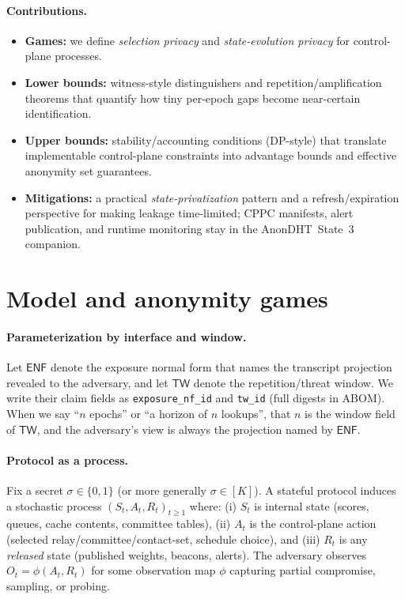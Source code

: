 \documentclass[11pt]{article}
\begin{document}
\paragraph{Contributions.}
\begin{itemize}[leftmargin=*]
\item \textbf{Games:} we define \emph{selection privacy} and \emph{state-evolution privacy} for control-plane processes.
\item \textbf{Lower bounds:} witness-style distinguishers and repetition/amplification theorems that quantify how tiny per-epoch gaps become near-certain identification.
\item \textbf{Upper bounds:} stability/accounting conditions (DP-style) that translate implementable control-plane constraints into advantage bounds and effective anonymity set guarantees.
\item \textbf{Mitigations:} a practical \emph{state-privatization} pattern and a refresh/expiration perspective for making leakage time-limited; CPPC manifests, alert publication, and runtime monitoring stay in the AnonDHT~State~3 companion.\cite{series:state3}
\end{itemize}


\section{Model and anonymity games}

\paragraph{Parameterization by interface and window.}
Let \(\mathsf{ENF}\) denote the exposure normal form that names the transcript projection revealed to the adversary, and let \(\mathsf{TW}\) denote the repetition/threat window.
We write their claim fields as \texttt{exposure\_nf\_id} and \texttt{tw\_id} (full digests in ABOM).
When we say ``\(n\) epochs'' or ``a horizon of \(n\) lookups'', that \(n\) is the window field of \(\mathsf{TW}\), and the adversary's view is always the projection named by \(\mathsf{ENF}\).

\label{sec:games}

\paragraph{Protocol as a process.}
Fix a secret $\sigma \in \{0,1\}$ (or more generally $\sigma\in[K]$).
A stateful protocol induces a stochastic process $(S_t,A_t,R_t)_{t\ge 1}$ where:
(i) $S_t$ is internal state (scores, queues, cache contents, committee tables),
(ii) $A_t$ is the control-plane action (selected relay/committee/contact-set, schedule choice), and
(iii) $R_t$ is any \emph{released} state (published weights, beacons, alerts).
The adversary observes $O_t = \phi(A_t,R_t)$ for some observation map $\phi$ capturing partial compromise, sampling, or probing.
\end{document}
